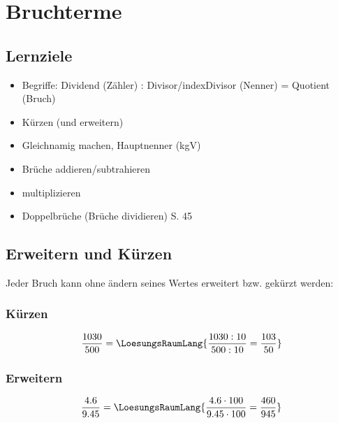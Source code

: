 \newpage
\section{Bruchterme}\label{bruchterme}

\subsection*{Lernziele}

\begin{itemize}
	\item Begriffe: Dividend (Zähler) :
  Divisor/index{Divisor} (Nenner) = Quotient (Bruch)
  \item Kürzen (und erweitern)
	\item Gleichnamig machen, Hauptnenner (kgV)
	\item Brüche addieren/subtrahieren
  \item multiplizieren
	\item Doppelbrüche (Brüche dividieren) S. 45 \cite{marthaler21alg}
\end{itemize}


\newpage

\subsection{Erweitern und Kürzen}

Jeder Bruch kann ohne ändern seines Wertes erweitert bzw. gekürzt
werden:

\subsubsection{Kürzen}
$$\frac{1030}{500} = \LoesungsRaumLang{\frac{1030 : 10}{500:10} =\frac{103}{50}}$$


\subsubsection{Erweitern}
$$\frac{4.6}{9.45} = \LoesungsRaumLang{\frac{4.6 \cdot{}100}{9.45\cdot{}100} =
\frac{460}{945}}$$
\newpage


